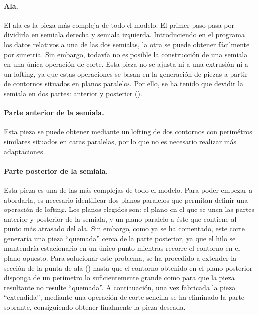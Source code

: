 \paragraph{Ala.} El ala es la pieza más compleja de todo el modelo. El primer paso pasa por dividirla en semiala derecha y semiala izquierda. Introduciendo en el programa los datos relativos a una de las dos semialas, la otra se puede obtener fácilmente por simetría. Sin embargo, todavía no es posible la construcción de una semiala en una única operación de corte. Esta pieza no se ajusta ni a una extrusión ni a un lofting, ya que estas operaciones se basan en la generación de piezas a partir de contornos situados en planos paralelos. Por ello, se ha tenido que devidir la semiala en dos partes: anterior y posterior ().

\paragraph{Parte anterior de la semiala.} Esta pieza se puede obtener mediante un lofting de dos contornos con perimétros similares situados en caras paralelas, por lo que no es necesario realizar más adaptaciones.

\paragraph{Parte posterior de la semiala.} Esta pieza es una de las más complejas de todo el modelo. Para poder empezar a abordarla, es necesario identificar dos planos paralelos que permitan definir una operación de lofting. Los planos elegidos son: el plano en el que se unen las partes anterior y posterior de la semiala, y un plano paralelo a éste que contiene al punto más atrasado del ala. Sin embargo, como ya se ha comentado, este corte generaría una pieza “quemada” cerca de la parte posterior, ya que el hilo se mantendría estacionario en un único punto mientras recorre el contorno en el plano opuesto. Para solucionar este problema, se ha procedido a extender la sección de la punta de ala () hasta que el contorno obtenido en el plano posterior disponga de un perímetro lo suficientemente grande como para que la pieza resultante no resulte “quemada”. A continuación, una vez fabricada la pieza “extendida”, mediante una operación de corte sencilla se ha eliminado la parte sobrante, consiguiendo obtener finalmente la pieza deseada.

